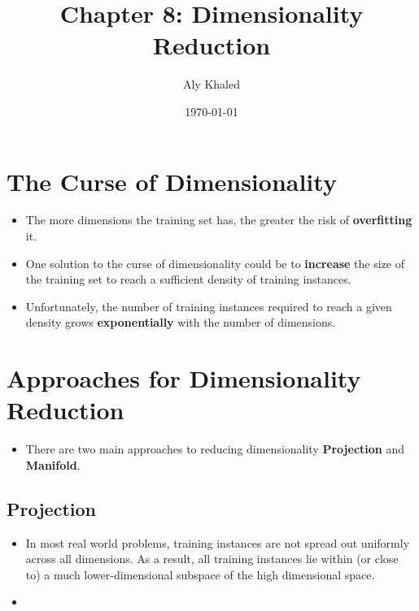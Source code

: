\documentclass{article}
\title{Chapter 8: Dimensionality Reduction}
\author{Aly Khaled}
\date{\today}
\begin{document}
 
    \maketitle
    \section{The Curse of Dimensionality}
    \begin{itemize}
    	\item The more dimensions the training set has, the greater the risk of \textbf{overfitting} it.
    	\item One solution to the curse of dimensionality could be to \textbf{increase} the size of the training set to reach a sufficient density of training instances.
    	\item Unfortunately, the number of training instances required to reach a given density grows \textbf{exponentially} with the number of dimensions.
    \end{itemize}
    \section{Approaches for Dimensionality Reduction}
    \begin{itemize}
    	\item There are two main approaches to reducing dimensionality \textbf{Projection} and \textbf{Manifold}.
	\end{itemize}
	\subsection{Projection}
	\begin{itemize}
		\item In most real world problems, training instances are not spread out uniformly across all dimensions. As a result, all training instances lie within (or close to) a much lower-dimensional subspace of the high dimensional space.
		\item  
	\end{itemize}	        
\end{document}
